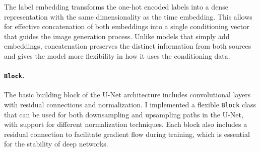 \documentclass[a4paper,twocolumn]{article}
\begin{document}
The label embedding transforms the one-hot encoded labels into a dense representation with the same dimensionality as the time embedding. This allows for effective concatenation of both embeddings into a single conditioning vector that guides the image generation process. Unlike models that simply add embeddings, concatenation preserves the distinct information from both sources and gives the model more flexibility in how it uses the conditioning data.

\paragraph{\texttt{Block}.}
The basic building block of the U-Net architecture includes convolutional layers with residual connections and normalization. I implemented a flexible \texttt{Block} class that can be used for both downsampling and upsampling paths in the U-Net, with support for different normalization techniques. Each block also includes a residual connection to facilitate gradient flow during training, which is essential for the stability of deep networks.
\end{document}
